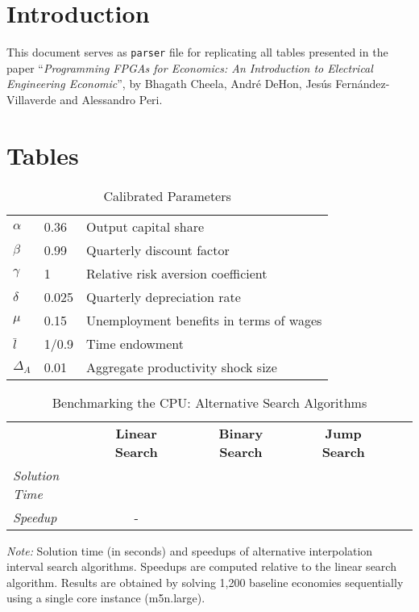 \documentclass[12pt,american]{article}
\makeatletter
\newcommand{\lbar}{\bar{l}}
\newcommand{\resultsfolder}{./results}
\newcommand{\devcpu}{cpu-cores}
\newcommand{\nKMIkI}{nKM4-nk100}
\newcommand{\cpuI}{m5n.large\@\xspace}
\newcommand{\cpucoreI}{1}
\newcommand{\cpulineartime}{}
\newcommand{\cpubinarytime}{}
\newcommand{\cpujumpsearchtime}{}
\newcommand{\cpubinaryspeedup}{}
\newcommand{\cpujumpsearchspeedup}{}
\newcommand{\numbeconII}{1,200\@\xspace}
\makeatother
\begin{document}

\section{Introduction}
This document serves as \texttt{parser} file for replicating all tables presented in the paper ``\textit{Programming FPGAs for Economics: An Introduction to Electrical Engineering Economic}'', by Bhagath Cheela, Andr\'e DeHon, Jes\'us Fern\'andez-Villaverde and Alessandro Peri.

\newpage
\section{Tables}\label{sec:int}

\begin{table}[ht!]
\caption{Calibrated Parameters}
\label{tab:parcal}
\vspace{-0.1in}
\begin{center}
\begin{tabular}{lll}
\toprule
$\alpha$ & 0.36  & Output capital share\\ 
$\beta$ & 0.99 & Quarterly discount factor\\
$\gamma$ & 1 & Relative risk aversion coefficient\\ 
$\delta$ & 0.025 & Quarterly depreciation rate\\ 
$\mu$  & 0.15 & Unemployment benefits in terms of wages\\ 
$\lbar$ & 1/0.9 & Time endowment\\ 
$\Delta_{A}$ & 0.01 & Aggregate productivity shock size\\
\bottomrule
\end{tabular}
\end{center}
\end{table}

\begin{table}[ht!]
\caption{Benchmarking the CPU: Alternative Search Algorithms}
\vspace{-0.1in}
\begin{center}
\setlength\tabcolsep{4pt}
\begin{tabular}{@{\extracolsep{\fill}}lccccccc}
\toprule
&\multicolumn{1}{c}{\textbf{Linear Search}}&
&\multicolumn{1}{c}{\textbf{Binary Search}}&
&\multicolumn{1}{c}{\textbf{Jump Search}}\\
\textit{Solution Time} &\cpulineartime &&\cpubinarytime &&\cpujumpsearchtime\\
\textit{Speedup} & - &&\cpubinaryspeedup &&\cpujumpsearchspeedup\\ 
\bottomrule
\end{tabular}
\label{tab:CPUben}
\end{center}
\small \textit{Note:} 
Solution time (in seconds) and speedups of alternative interpolation interval search algorithms. Speedups are computed relative to the linear search algorithm. Results are obtained by solving \numbeconII baseline economies sequentially using a single core instance (\cpuI).
\end{table}
\end{document}
